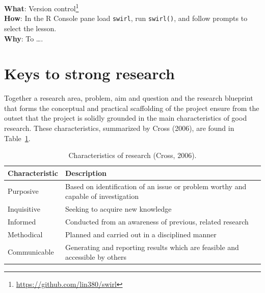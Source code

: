 \documentclass[
  letterpaper,
]{scrbook}
\DeclareRobustCommand{\href}[2]{#2\footnote{\url{#1}}}
\begin{document}
\begin{tcolorbox}[enhanced jigsaw, title=\textcolor{quarto-callout-tip-color}{\faLightbulb}\hspace{0.5em}{Interactive programming}, titlerule=0mm, toptitle=1mm, colbacktitle=quarto-callout-tip-color!10!white, bottomtitle=1mm, left=2mm, colframe=quarto-callout-tip-color-frame, breakable, toprule=.15mm, colback=white, opacitybacktitle=0.6, leftrule=.75mm, rightrule=.15mm, bottomrule=.15mm, arc=.35mm, coltitle=black, opacityback=0]

\textbf{What}: \href{https://github.com/lin380/swirl}{Version control}\\
\textbf{How}: In the R Console pane load \texttt{swirl}, run
\texttt{swirl()}, and follow prompts to select the lesson.\\
\textbf{Why}: To \ldots.

\end{tcolorbox}

\hypertarget{keys-to-strong-research}{%
\section{Keys to strong research}\label{keys-to-strong-research}}

Together a research area, problem, aim and question and the research
blueprint that forms the conceptual and practical scaffolding of the
project ensure from the outset that the project is solidly grounded in
the main characteristics of good research. These characteristics,
summarized by Cross (2006), are found in
Table~\ref{tbl-fr-cross-research-char-table}.

\hypertarget{tbl-fr-cross-research-char-table}{}
\begin{table}
\caption{\label{tbl-fr-cross-research-char-table}Characteristics of research (Cross, 2006). }\tabularnewline

\centering
\begin{tabular}{ll}
\toprule
Characteristic & Description\\
\midrule
Purposive & Based on identification of an issue or problem worthy and capable of investigation\\
Inquisitive & Seeking to acquire new knowledge\\
Informed & Conducted from an awareness of previous, related research\\
Methodical & Planned and carried out in a disciplined manner\\
Communicable & Generating and reporting results which are feasible and accessible by others\\
\bottomrule
\end{tabular}
\end{table}
\end{document}
